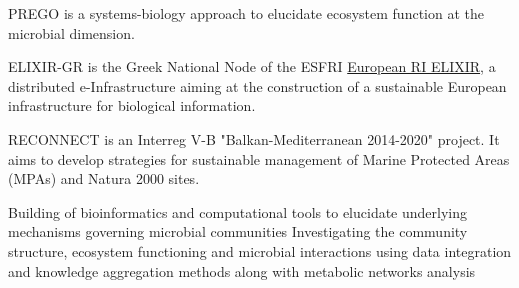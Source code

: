 \documentclass[
	a4paper,
]{fortysecondscv}
\begin{document}
\makefrontsidebar

\begin{cvtable}[3]


	{PREGO is a systems-biology approach to elucidate ecosystem function at the microbial dimension.}
	
	{ELIXIR-GR is the Greek National Node of the ESFRI \href{https://elixir-europe.org/}{European RI ELIXIR}, a distributed e-Infrastructure aiming at the construction of a sustainable European infrastructure for biological information.}
	
	{RECONNECT is an Interreg V-B "Balkan-Mediterranean 2014-2020" project. It aims to develop strategies for sustainable management of Marine Protected Areas (MPAs) and Natura 2000 sites.}

\end{cvtable}






\begin{cvtable}[1.5]
	    {Building of bioinformatics and computational tools to elucidate underlying mechanisms governing microbial communities}
	    {Investigating the community structure, ecosystem functioning and microbial interactions using data integration and knowledge aggregation methods along with metabolic networks analysis}
\end{cvtable}
\end{document}
